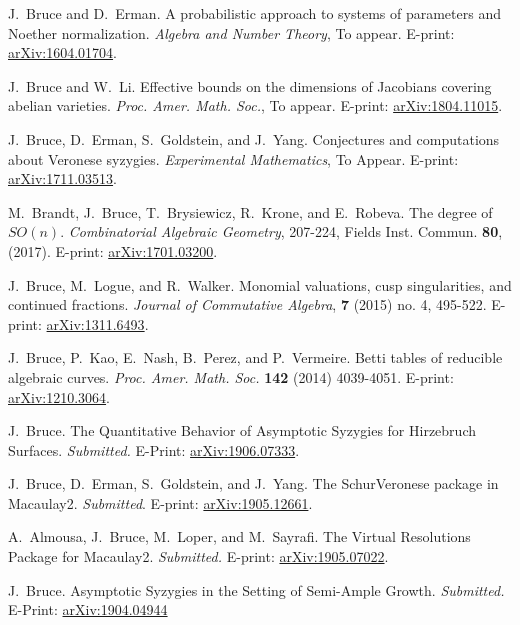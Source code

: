 \documentclass[svgnames,11pt]{article}
\begin{document}
\begin{bibenum}[itemsep=5pt]

    \item
	J.~Bruce and D.~Erman. A probabilistic approach to systems of parameters and Noether normalization. {\it Algebra and Number Theory}, To appear. E-print: \hyperref{http://arxiv.org/abs/1604.01704}{}{}{arXiv:1604.01704}.
	
\item
	J.~Bruce and W.~Li. Effective bounds on the dimensions of Jacobians covering abelian varieties.  {\it Proc. Amer. Math. Soc.}, To appear. E-print: \hyperref{https://arxiv.org/abs/1804.11015}{}{}{arXiv:1804.11015}.
			
\item
	J.~Bruce, D.~Erman, S.~Goldstein, and J.~Yang. Conjectures and computations about Veronese syzygies.  {\it Experimental Mathematics}, To Appear. E-print: \hyperref{https://arxiv.org/abs/1711.03513}{}{}{arXiv:1711.03513}.
	
\item
	M.~Brandt, J.~Bruce, T.~Brysiewicz, R.~Krone, and E.~Robeva. The degree of $SO(n)$. {\it Combinatorial Algebraic Geometry}, 207-224, Fields Inst. Commun. \textbf{80}, (2017). E-print: \hyperref{https://arxiv.org/abs/1701.03200}{}{}{arXiv:1701.03200}.
	
\item
	J.~Bruce, M.~Logue, and R.~Walker. Monomial valuations, cusp singularities, and continued fractions. {\it Journal of Commutative Algebra}, \textbf{7} (2015) no. 4, 495-522. E-print: \hyperref{http://arxiv.org/abs/1311.6493}{}{}{arXiv:1311.6493}.

\item
	J.~Bruce, P.~Kao, E.~Nash, B.~Perez, and P.~Vermeire. Betti tables of reducible algebraic curves. {\it Proc. Amer. Math. Soc.} \textbf{142} (2014) 4039-4051. E-print: \hyperref{http://arxiv.org/abs/1210.3064}{}{}{arXiv:1210.3064}.

\item
	J.~Bruce. The Quantitative Behavior of Asymptotic Syzygies for Hirzebruch Surfaces. {\it Submitted.} E-Print:  \hyperref{http://arxiv.org/abs/1906.07333}{}{}{arXiv:1906.07333}.
	
\item
	J.~Bruce, D.~Erman, S.~Goldstein, and J.~Yang. The SchurVeronese package in Macaulay2.  {\it Submitted}. E-print: \hyperref{https://arxiv.org/abs/1905.12661}{}{}{arXiv:1905.12661}.
	
\item
	A.~Almousa, J.~Bruce, M.~Loper, and M.~Sayrafi. The Virtual Resolutions Package for Macaulay2.  {\it Submitted.} E-print: \hyperref{http://arxiv.org/abs/1905.07022}{}{}{arXiv:1905.07022}.
	
\item
	J.~Bruce. Asymptotic Syzygies in the Setting of Semi-Ample Growth. {\it Submitted.}\\ E-Print:  \hyperref{https://arxiv.org/abs/1904.04944}{}{}{arXiv:1904.04944}
	
\end{bibenum}
\end{document}

